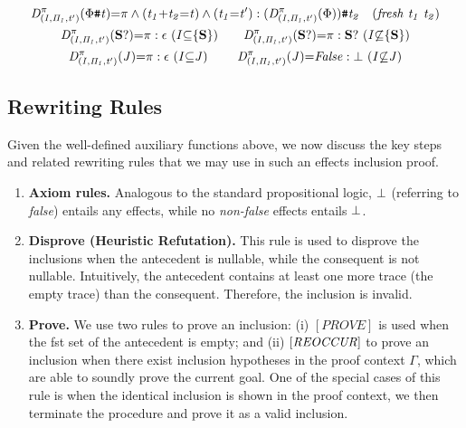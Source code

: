 \documentclass[acmsmall,10pt,review]{acmart}
\newcommand{\effect}{\textcolor{black}{\ensuremath{\mathrm{\Phi}}}}
\newcommand{\code}[1]{{\tt{\ensuremath{\m{#1}}}}}
\newcommand{\codeme}[1]{{\tt{\ensuremath{#1}}}}
\newcommand{\empt}{\textcolor{black}{\ensuremath{\epsilon}}}
\newcommand{\bott}{\textcolor{black}{\ensuremath{\bot}}}
\newcommand{\m}{\mathit}
\newcommand{\mysharp}{{\mathrel{\texttt{\#}}}}
\begin{document}
{\begin{definition}
\begin{gather*}
\code{D^{\pi}_{(I, \Pi_1, t^\prime)}(  \effect \mysharp  t) } {=}
\code{
\pi \wedge(t_1{+} t_2 {=}t) \wedge (t_1{=}t^\prime) : (D^{\pi}_{(I, \Pi_1, t^\prime)}(\effect))\mysharp  t_2} \ \ \ 
\code{(fresh \ t_1\ t_2 )}
\\
\code{D^{\pi}_{(I, \Pi_1, t^\prime)}(\textbf{S}?)} {=} \code{\pi: \empt\ (}\code{ I {\subseteq} \{\textbf{S}\})}
\qquad
\code{D^{\pi}_{(I, \Pi_1, t^\prime)}(\textbf{S}?)} {=} \code{\pi: \textbf{S}?\ (}\code{ I {\not\subseteq} \{\textbf{S}\})}
\\
\code{D^{\pi}_{(I, \Pi_1, t^\prime)}(J)} {=} \code{\pi: \empt\ (}\code{ I {\subseteq} J)}
\qquad\ 
    \code{D^{\pi}_{(I, \Pi_1, t^\prime)}( J)} {=} \code{False : \bott \ (}\code{I {\not\subseteq} J)} 
\end{gather*}
\end{definition}




\subsection{Rewriting Rules}
\label{InferenceRules}
Given the well-defined auxiliary functions above, we now discuss the key steps and related rewriting rules that we may use in such an effects inclusion proof.  


\begin{enumerate}
\item 
\textbf{Axiom rules.}
\label{Base}
Analogous to  the standard propositional logic, \code{\bott} (referring to \textit{false}) entails any effects, while no \textit{non-false} effects entails \code{\bott}.


\item 
\textbf{Disprove (Heuristic Refutation).}
\label{Refutation}
This rule is used to disprove the inclusions when the antecedent is nullable, while the consequent is not nullable. Intuitively, the antecedent contains at least one more trace (the empty trace) than the consequent. Therefore, the inclusion is invalid. 

\vspace{-4mm}


\item 
\textbf{Prove.}
\label{Prove}
We use two rules to prove an inclusion: (i) \codeme{[PROVE]} is used when the fst set of the antecedent is empty; and (ii) $\code{[REOCCUR]}$ to prove an inclusion
when there exist inclusion hypotheses 
in the proof context $\m{\Gamma}$, which are able to soundly prove the current goal. One of the special cases of this rule is when the identical inclusion is shown in the proof context, we then terminate the procedure and prove it as a valid inclusion. 



\end{enumerate}}
\end{document}
